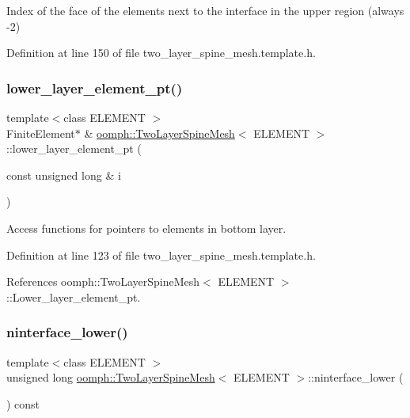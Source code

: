 Index of the face of the elements next to the interface in the upper region (always -\/2) 



Definition at line 150 of file two\+\_\+layer\+\_\+spine\+\_\+mesh.\+template.\+h.

\mbox{\label{classoomph_1_1TwoLayerSpineMesh_a37e08f5f396767bdad632d9b8022655a}} 
\subsubsection{\texorpdfstring{lower\+\_\+layer\+\_\+element\+\_\+pt()}{lower\_layer\_element\_pt()}}
{\footnotesize\ttfamily template$<$class E\+L\+E\+M\+E\+NT $>$ \\
Finite\+Element$\ast$ \& \hyperlink{classoomph_1_1TwoLayerSpineMesh}{oomph\+::\+Two\+Layer\+Spine\+Mesh}$<$ E\+L\+E\+M\+E\+NT $>$\+::lower\+\_\+layer\+\_\+element\+\_\+pt (\begin{DoxyParamCaption}\item[{const unsigned long \&}]{i }\end{DoxyParamCaption})\hspace{0.3cm}{\ttfamily [inline]}}



Access functions for pointers to elements in bottom layer. 



Definition at line 123 of file two\+\_\+layer\+\_\+spine\+\_\+mesh.\+template.\+h.



References oomph\+::\+Two\+Layer\+Spine\+Mesh$<$ E\+L\+E\+M\+E\+N\+T $>$\+::\+Lower\+\_\+layer\+\_\+element\+\_\+pt.

\mbox{\label{classoomph_1_1TwoLayerSpineMesh_a5ad10a9a2022a32e2a5f311f789fae51}} 
\subsubsection{\texorpdfstring{ninterface\+\_\+lower()}{ninterface\_lower()}}
{\footnotesize\ttfamily template$<$class E\+L\+E\+M\+E\+NT $>$ \\
unsigned long \hyperlink{classoomph_1_1TwoLayerSpineMesh}{oomph\+::\+Two\+Layer\+Spine\+Mesh}$<$ E\+L\+E\+M\+E\+NT $>$\+::ninterface\+\_\+lower (\begin{DoxyParamCaption}{ }\end{DoxyParamCaption}) const\hspace{0.3cm}{\ttfamily [inline]}}



